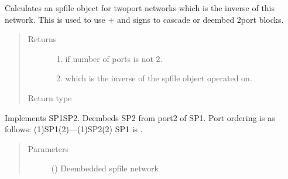 \documentclass[letterpaper,10pt,english]{sphinxmanual}
\begin{document}
\begin{fulllineitems}
\begin{fulllineitems}
\label{\detokenize{touchstone:touchstone.spfile.__neg__}}
Calculates an spfile object for two\sphinxhyphen{}port networks which is the inverse of this network. This is used to use + and \sphinxhyphen{} signs to cascade or deembed 2\sphinxhyphen{}port blocks.
\begin{quote}\begin{description}
\item[{Returns}] \leavevmode
\begin{enumerate}
%
\item {} 
 if number of ports is not 2.

\item {} 
 which is the inverse of the spfile object operated on.

\end{enumerate}


\item[{Return type}] \leavevmode
{\hyperref[\detokenize{touchstone:touchstone.spfile}]{}}

\end{description}\end{quote}

\end{fulllineitems}


\begin{fulllineitems}
\label{\detokenize{touchstone:touchstone.spfile.__sub__}}
Implements SP1\sphinxhyphen{}SP2.
Deembeds SP2 from port\sphinxhyphen{}2 of SP1.
Port ordering is as follows:
(1)\sphinxhyphen{}SP1\sphinxhyphen{}(2)—(1)\sphinxhyphen{}SP2\sphinxhyphen{}(2)
SP1 is .
\begin{quote}\begin{description}
\item[{Parameters}] \leavevmode
{} ({\hyperref[\detokenize{touchstone:touchstone.spfile}]{}}) \textendash{} Deembedded spfile network


\end{description}
\end{quote}
\end{fulllineitems}
\end{fulllineitems}
\end{document}
